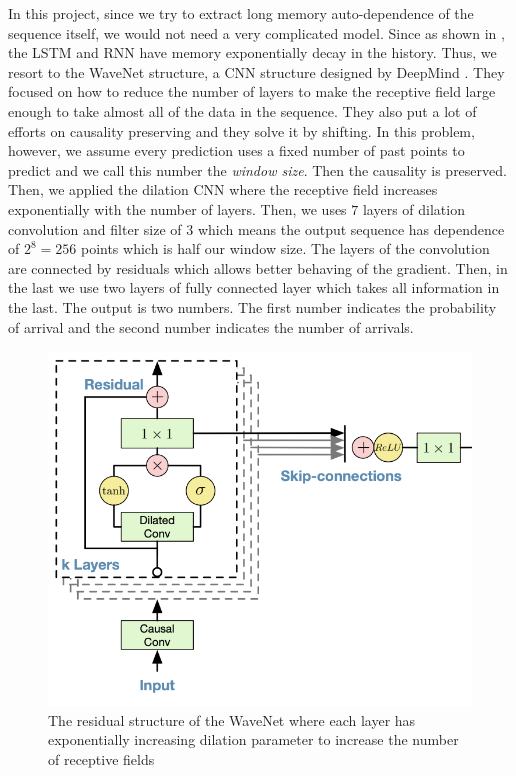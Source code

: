 \documentclass[letterpaper,12pt]{article}
\numberwithin{equation}{section}
\begin{document}
In this project, since we try to extract long memory auto-dependence of the sequence itself, we would not need a very complicated model. Since as shown in \cite{zhao2020rnn}, the LSTM and RNN have memory exponentially decay in the history. Thus, we resort to the WaveNet structure, a CNN structure designed by DeepMind \cite{DBLP:journals/corr/OordDZSVGKSK16}. They focused on how to reduce the number of layers to make the receptive field large enough to take almost all of the data in the sequence. They also put a lot of efforts on causality preserving and they solve it by shifting. In this problem, however, we assume every prediction uses a fixed number of past points to predict and we call this number the \textit{window size}. Then the causality is preserved. Then, we applied the dilation CNN where the receptive field increases exponentially with the number of layers. Then, we uses $7$ layers of dilation convolution and filter size of $3$ which means the output sequence has dependence of $2^8 = 256$ points which is half our window size. The layers of the convolution are connected by residuals which allows better behaving of the gradient. 
Then, in the last we use two layers of fully connected layer which takes all information in the last. The output is two numbers. The first number indicates the probability of arrival and the second number indicates the number of arrivals. 


\begin{figure}
    \centering
    \includegraphics[scale = 0.4]{figs/wavent.png}
    \caption{\small The residual structure of the WaveNet where each layer has exponentially increasing dilation parameter to increase the number of receptive fields}
    \label{fig:my_label}
\end{figure}
\end{document}
